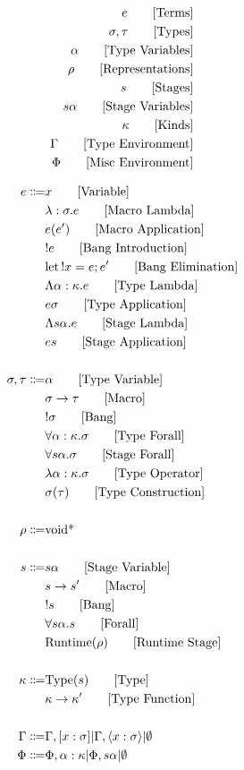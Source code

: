 \documentclass {article}
\begin{document}
\Large

\begin{align*}
e \tag* {[Terms]}\\
\sigma, \tau \tag* {[Types]} \\
\alpha \tag* {[Type Variables]} \\
\rho \tag* {[Representations]} \\
s \tag* {[Stages]} \\
s \alpha \tag* {[Stage Variables]} \\
\kappa \tag* {[Kinds]} \\
\Gamma \tag* {[Type Environment]} \\
\Phi \tag* {[Misc Environment]}
\end{align*}

\begin{align*}
e \Coloneqq & x \tag*{[Variable]}\\
& \lambda : \sigma. e \tag*{[Macro Lambda]}\\
& e(e') \tag*{[Macro Application]}\\
& !e \tag*{[Bang Introduction]} \\
& \text{let} \, !x = e; e' \tag*{[Bang Elimination]} \\ 
& \Lambda \alpha : \kappa. e \tag*{[Type Lambda]} \\
& e \sigma \tag*{[Type Application]} \\
& \Lambda s \alpha. e \tag*{[Stage Lambda]} \\
& e s \tag*{[Stage Application]} \\
\\
\sigma, \tau \Coloneqq & \alpha \tag* {[Type Variable]}\\
& \sigma \to \tau \tag*{[Macro]}\\
& !\sigma \tag*{[Bang]} \\
& \forall \alpha : \kappa. \sigma \tag*{[Type Forall]}\\ 
& \forall s \alpha. \sigma \tag*{[Stage Forall]}\\
& \lambda \alpha : \kappa. \sigma \tag*{[Type Operator]} \\
& \sigma (\tau) \tag*{[Type Construction]} \\
\\
\rho \Coloneqq & \text{void*}\\
\\
s \Coloneqq & s \alpha \tag*{[Stage Variable]}\\
& s \to s' \tag*{[Macro]} \\
& !s \tag*{[Bang]} \\
& \forall s \alpha. s \tag*{[Forall]}\\
& \text{Runtime} (\rho) \tag*{[Runtime Stage]}\\
\\
\kappa \Coloneqq & \text{Type} (s) \tag*{[Type]} \\
& \kappa \to \kappa' \tag*{[Type Function]} \\
\\
\Gamma \Coloneqq & \Gamma, [x : \sigma] | \Gamma, \langle x : \sigma \rangle | \emptyset \\
\Phi \Coloneqq & \Phi, \alpha : \kappa | \Phi, s \alpha |  \emptyset \\
\end{align*}
\end{document}
